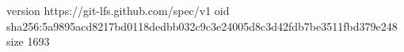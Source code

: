 version https://git-lfs.github.com/spec/v1
oid sha256:5a9895acd8217bd0118dedbb032c9c3e24005d8c3d42fdb7be3511fbd379e248
size 1693
